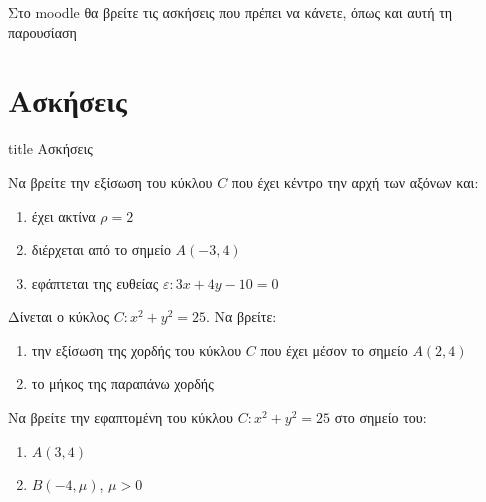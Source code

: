 \documentclass{../../presentation}
\begin{document}
\begin{frame}[noframenumbering]
  Στο moodle θα βρείτε τις ασκήσεις που πρέπει να κάνετε, όπως και αυτή τη παρουσίαση
\end{frame}

\section{Ασκήσεις}

\begin{frame}[noframenumbering]
  \vfill
  \centering
  \begin{beamercolorbox}[sep=8pt,center,shadow=true,rounded=true]{title}
    Ασκήσεις
  \end{beamercolorbox}
  \vfill
\end{frame}

\begin{askisi}
  Να βρείτε την εξίσωση του κύκλου $C$ που έχει κέντρο την αρχή των αξόνων και:
  \begin{enumerate}
    \item<1-> έχει ακτίνα $ρ=2$
    \item<2-> διέρχεται από το σημείο $Α(-3,4)$
    \item<3-> εφάπτεται της ευθείας $ε:3x+4y-10=0$
  \end{enumerate}

\end{askisi}

\begin{askisi}
  Δίνεται ο κύκλος $C:x^2+y^2=25$. Να βρείτε:
  \begin{enumerate}
    \item<1-> την εξίσωση της χορδής του κύκλου $C$ που έχει μέσον το σημείο $Α(2,4)$
    \item<2-> το μήκος της παραπάνω χορδής
  \end{enumerate}

\end{askisi}

\begin{askisi}
  Να βρείτε την εφαπτομένη του κύκλου $C:x^2+y^2=25$ στο σημείο του:
  \begin{enumerate}
    \item<1-> $Α(3,4)$
    \item<2-> $Β(-4,μ)$, $μ>0$
  \end{enumerate}

\end{askisi}
\end{document}
